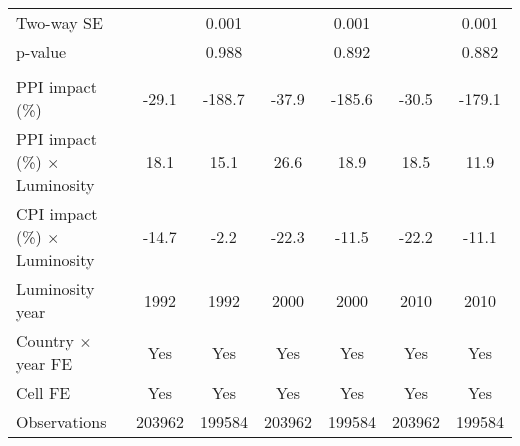{\begin{tabular}{l*{6}{c}}
\hspace{15pt} Two-way SE&                     &       0.001         &                     &       0.001         &                     &       0.001         \\
\hspace{25pt} p-value&                     &       0.988         &                     &       0.892         &                     &       0.882         \\
\hline \\ PPI impact (\%)&       -29.1         &      -188.7         &       -37.9         &      -185.6         &       -30.5         &      -179.1         \\
PPI impact (\%) $\times$ Luminosity&        18.1         &        15.1         &        26.6         &        18.9         &        18.5         &        11.9         \\
CPI impact (\%) $\times$ Luminosity&       -14.7         &        -2.2         &       -22.3         &       -11.5         &       -22.2         &       -11.1         \\
\hline  Luminosity year&        1992         &        1992         &        2000         &        2000         &        2010         &        2010         \\
Country $\times$ year FE&         Yes         &         Yes         &         Yes         &         Yes         &         Yes         &         Yes         \\
Cell FE             &         Yes         &         Yes         &         Yes         &         Yes         &         Yes         &         Yes         \\
Observations        &      203962         &      199584         &      203962         &      199584         &      203962         &      199584         \\
\hline\hline
\end{tabular}
}
